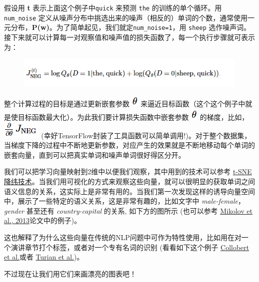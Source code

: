 假设用 \textbf{t} 表示上面这个例子中\texttt{quick} 来预测 \texttt{the}
的训练的单个循环。用 \texttt{num\_noise}
定义从噪声分布中挑选出来的噪声（相反的）单词的个数，通常使用一元分布，\textbf{P(w)}。为了简单起见，我们就定\texttt{num\_noise=1}，用
\texttt{sheep}
选作噪声词。接下来就可以计算每一对观察值和噪声值的损失函数了，每一个执行步骤就可表示为：

\begin{figure}[htbp]
\centering
\includegraphics{../SOURCE/images/vr4.png}
\caption{}
\end{figure}

整个计算过程的目标是通过更新嵌套参数
\includegraphics{../SOURCE/images/theta.png}
来逼近目标函数（这个这个例子中就是使目标函数最大化）。为此我们要计算损失函数中嵌套参数
\includegraphics{../SOURCE/images/theta.png} 的梯度，比如，
\includegraphics{../SOURCE/images/vr5.png}
(幸好TensorFlow封装了工具函数可以简单调用!)。对于整个数据集，当梯度下降的过程中不断地更新参数，对应产生的效果就是不断地移动每个单词的嵌套向量，直到可以把真实单词和噪声单词很好得区分开。

我们可以把学习向量映射到2维中以便我们观察，其中用到的技术可以参考
\href{http://lvdmaaten.github.io/tsne/}{t-SNE
降纬技术}。当我们用可视化的方式来观察这些向量，就可以很明显的获取单词之间语义信息的关系，这实际上是非常有用的。当我们第一次发现这样的诱导向量空间中，展示了一些特定的语义关系，这是非常有趣的，比如文字中
\emph{male-female}，\emph{gender} 甚至还有 \emph{country-capital}
的关系, 如下方的图所示 (也可以参考
\href{http://www.aclweb.org/anthology/N13-1090}{Mikolov et al.,
2013}论文中的例子)。

这也解释了为什么这些向量在传统的NLP问题中可作为特性使用，比如用在对一个演讲章节打个标签，或者对一个专有名词的识别
(看看如下这个例子 \href{http://arxiv.org/pdf/1103.0398v1.pdf}{Collobert
et al.}或者 \href{http://www.aclweb.org/anthology/P10-1040}{Turian et
al.})。

不过现在让我们用它们来画漂亮的图表吧！


